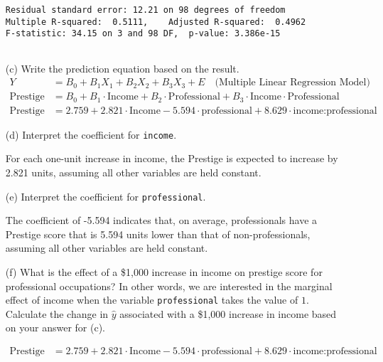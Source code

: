 \documentclass[12pt,letterpaper]{article}
\begin{document}
\begin{enumerate}
\begin{verbatim}
Residual standard error: 12.21 on 98 degrees of freedom
Multiple R-squared:  0.5111,	Adjusted R-squared:  0.4962 
F-statistic: 34.15 on 3 and 98 DF,  p-value: 3.386e-15
		
	\end{verbatim}
	
	\vspace{0cm}
	\newpage
	\item [(c)]
	Write the prediction equation based on the result.
\begin{align*}
	Y &= B_0 + B_1X_1 + B_2X_2 + B_3X_3 + E \quad \text{(Multiple Linear Regression Model)} \\
	\text{Prestige} &= B_0 + B_1 \cdot \text{Income} + B_2 \cdot \text{Professional} + B_3 \cdot \text{Income} \cdot \text{Professional} \\
	\text{Prestige} &= 2.759 + 2.821 \cdot \text{Income} - 5.594 \cdot \text{professional} + 8.629 \cdot \text{income:professional}
\end{align*}

	\vspace{1cm}

	\item [(d)]
	Interpret the coefficient for \texttt{income}.

	
	 For each one-unit increase in income, the Prestige is expected to increase by 2.821 units, assuming all other variables are held constant.
	
	\vspace{1cm}	
	
	\item [(e)]
	Interpret the coefficient for \texttt{professional}.
	
	The coefficient of -5.594 indicates that, on average, professionals have a Prestige score that is 5.594 units lower than that of non-professionals, assuming all other variables are held constant.
	
	\vspace{1cm}	
	
	\item [(f)]
	What is the effect of a \$1,000 increase in income on prestige score for professional occupations? In other words, we are interested in the marginal effect of income when the variable \texttt{professional} takes the value of $1$. Calculate the change in $\hat{y}$ associated with a \$1,000 increase in income based on your answer for (c).
	
	\begin{align*}
		\text{Prestige} &= 2.759 + 2.821 \cdot \text{Income} - 5.594 \cdot \text{professional} + 8.629 \cdot \text{income:professional}	
	\end{align*}
	

\end{enumerate}
\end{document}
